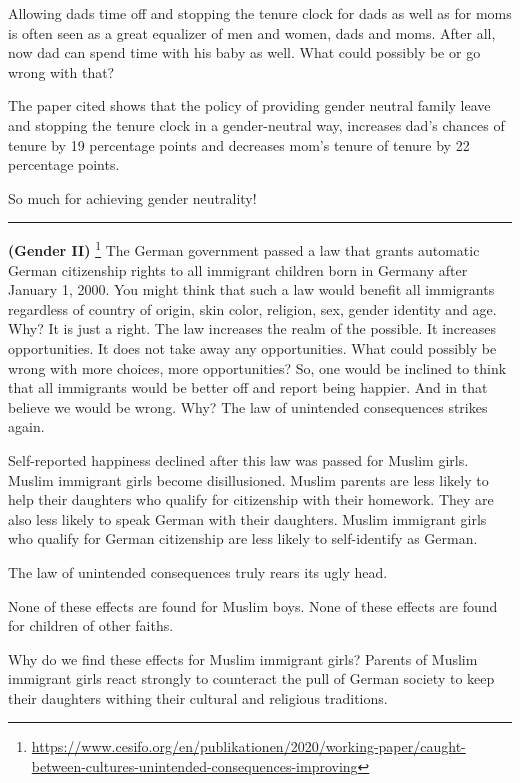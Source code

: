 \documentclass[
]{book}
\begin{document}
Allowing dads time off and stopping the tenure clock for dads as well as for moms is often seen as a great equalizer of men and women, dads and moms. After all, now dad can spend time with his baby as well. What could possibly be or go wrong with that?

The paper cited shows that the policy of providing gender neutral family leave and stopping the tenure clock in a gender-neutral way, increases dad's chances of tenure by 19 percentage points and decreases mom's tenure of tenure by 22 percentage points.

So much for achieving gender neutrality!

\begin{center}\rule{0.5\linewidth}{0.5pt}\end{center}

\textbf{(Gender II)} \footnote{\url{https://www.cesifo.org/en/publikationen/2020/working-paper/caught-between-cultures-unintended-consequences-improving}} The German government passed a law that grants automatic German citizenship rights to all immigrant children born in Germany after January 1, 2000. You might think that such a law would benefit all immigrants regardless of country of origin, skin color, religion, sex, gender identity and age. Why? It is just a right. The law increases the realm of the possible. It increases opportunities. It does not take away any opportunities. What could possibly be wrong with more choices, more opportunities? So, one would be inclined to think that all immigrants would be better off and report being happier. And in that believe we would be wrong. Why? The law of unintended consequences strikes again.

Self-reported happiness declined after this law was passed for Muslim girls. Muslim immigrant girls become disillusioned. Muslim parents are less likely to help their daughters who qualify for citizenship with their homework. They are also less likely to speak German with their daughters. Muslim immigrant girls who qualify for German citizenship are less likely to self-identify as German.

The law of unintended consequences truly rears its ugly head.

None of these effects are found for Muslim boys. None of these effects are found for children of other faiths.

Why do we find these effects for Muslim immigrant girls? Parents of Muslim immigrant girls react strongly to counteract the pull of German society to keep their daughters withing their cultural and religious traditions.
\end{document}
